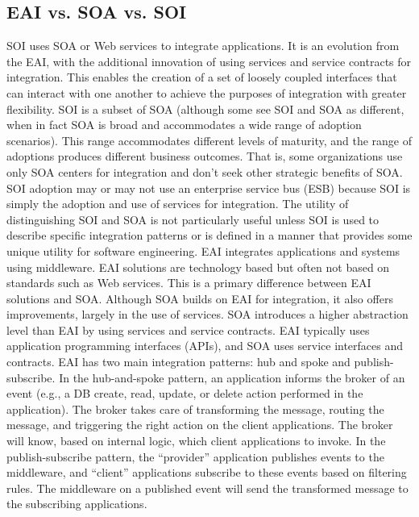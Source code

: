 \documentclass[12pt,a4paper,final,twoside,onecolumn,titlepage]{book}
\begin{document}
\subsection{EAI vs. SOA vs. SOI}
\gls{SOI} uses \gls{SOA} or Web services to integrate applications. It is an evolution from the \gls{EAI}, with the additional innovation of using services and service contracts for integration. This enables the creation of a set of loosely coupled interfaces that can interact with one another to achieve the purposes of integration with greater flexibility. \gls{SOI} is a subset of \gls{SOA} (although some see \gls{SOI} and \gls{SOA} as different, when in fact \gls{SOA} is broad and accommodates a wide range of adoption scenarios). This range accommodates different levels of maturity, and the range of adoptions produces different business outcomes. That is, some organizations use only \gls{SOA} centers for integration and don’t seek other strategic benefits of \gls{SOA}. \gls{SOI} adoption may or may not use an enterprise service bus (ESB) because \gls{SOI} is simply the adoption and use of services for integration. The utility of distinguishing \gls{SOI} and \gls{SOA} is not particularly useful unless \gls{SOI} is used to describe specific integration patterns or is defined in a manner that provides some unique utility for software engineering. \gls{EAI} integrates applications and systems using middleware. \gls{EAI} solutions are technology based but often not based on standards such as Web services. This is a primary difference between \gls{EAI} solutions and \gls{SOA}. Although \gls{SOA} builds on \gls{EAI} for integration, it also offers improvements, largely in the use of services. \gls{SOA} introduces a higher abstraction level than \gls{EAI} by using services and service contracts. \gls{EAI} typically uses application programming interfaces (APIs), and \gls{SOA} uses service interfaces and contracts.
\gls{EAI} has two main integration patterns: hub and spoke and publish-subscribe. In the hub-and-spoke pattern, an application informs the broker of an event (e.g., a \gls{DB} create, read, update, or delete action performed in the application). The broker takes care of transforming the message, routing the message, and triggering the right action on the client applications. The broker will know, based on internal logic, which client applications to invoke. In the publish-subscribe pattern, the “provider” application publishes events to the middleware, and “client” applications subscribe to these events based on filtering rules. The middleware on a published event will send the transformed message to the subscribing applications.
\end{document}

